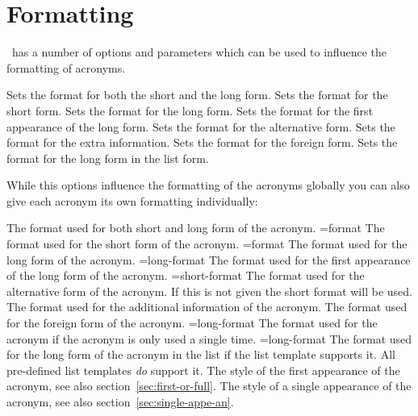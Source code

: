 \documentclass{acro-manual}
\begin{document}
\section{Formatting}\label{sec:formatting}
\acro\ has a number of options and parameters which can be used to influence
the formatting of acronyms.
\begin{options}
  \Initial
    Sets the format for both the short and the long form.
  \Initial
    Sets the format for the short form.
  \Initial
    Sets the format for the long form.
  \Initial
    Sets the format for the first appearance of the long form.
  \Initial
    Sets the format for the alternative form.
  \Initial
    Sets the format for the extra information.
  \Initial
    Sets the format for the foreign form.
  \Initial
    Sets the format for the long form in the list form.
\end{options}
While this options influence the formatting of the acronyms globally you can
also give each acronym its own formatting individually:
\begin{properties}
  \Initial
    The format used for both short and long form of the acronym.
  \Initial={format}
    The format used for the short form of the acronym.
  \Initial={format}
    The format used for the long form of the acronym.
  \Initial={long-format}
    The format used for the first appearance of the long form of the acronym.
  \Initial={short-format}
    The format used for the alternative form of the acronym. If this is not
    given the short format will be used.
  \Initial
    The format used for the additional information of the acronym.
  \Initial
    The format used for the foreign form of the acronym.
  \Initial={long-format}
    The format used for the acronym if the acronym is only used a single
    time.
  \Initial={long-format}
    The format used for the long form of the acronym in the list if the list
    template supports it. All pre-defined list templates \emph{do} support
    it.
  \Initial
    The style of the first appearance of the acronym, see also
    section~\vref{sec:first-or-full}.
  \Initial
    The style of a single appearance of the acronym, see also
    section~\vref{sec:single-appe-an}.
\end{properties}
\end{document}
